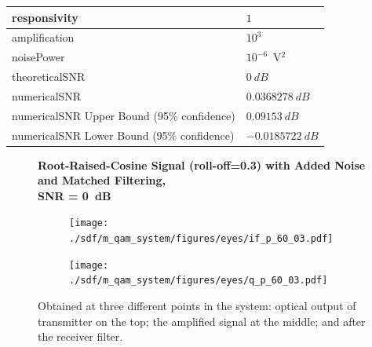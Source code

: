 \begin{refsection}
\begin{table}[H]
\begin{tabular}{|l|l|}
		responsivity           & $1$                                                        \\ \hline
		amplification          & $10^3$                                                     \\ \hline
		noisePower   & $10^{-6}$~V$^2$                             					\\ \hline
								theoreticalSNR  	   & $0~dB$                             					\\ \hline
		numericalSNR 		     & $0.0368278~dB$                             					\\ \hline
		numericalSNR Upper Bound (95\% confidence) & $0.09153~dB$                             					\\ \hline
		numericalSNR Lower Bound (95\% confidence) & $-0.0185722~dB$                             					\\ \hline
	\end{tabular}
\end{table}
\begin{figure}[H]
		\centering
	\textbf{Root-Raised-Cosine Signal (roll-off=0.3) with Added Noise and Matched Filtering,\\ SNR = 0~dB}
	\begin{minipage}{\linewidth}
		\centering
	\begin{subfigure}{.45\textwidth}
		\centering
		\texttt{[image: ./sdf/m\_qam\_system/figures/eyes/if\_p\_60\_03.pdf]}
	\end{subfigure}
	\begin{subfigure}{.45\textwidth}
		\centering
		\texttt{[image: ./sdf/m\_qam\_system/figures/eyes/q\_p\_60\_03.pdf]}
	\end{subfigure}
	
	\caption{
		Obtained at three different points in the system: optical output of transmitter on the top;
		the amplified signal at the middle; and
		after the receiver filter.
		\label{fig:eyes_n_rc_60_03}}
	\end{minipage}
\end{figure}




\end{refsection}
